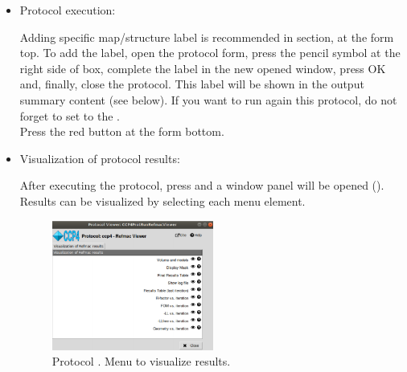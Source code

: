 \begin{itemize}
\item Protocol execution:

  Adding specific map/structure label is recommended in  section, at the form top. To add the label, open the protocol form, press the pencil symbol at the right side of  box, complete the label in the new opened window, press OK and, finally, close the protocol. This label will be shown in the output summary content (see below). If you want to run again this protocol, do not forget to set to  the .\\
  Press the  red button at the form bottom.\\
  
  \item Visualization of protocol results:
  
  After executing the protocol, press  and a window panel will be opened (). Results can be visualized by selecting each menu element. 
  
  \begin{figure}[H]
     \centering 
     \captionsetup{width=.9\linewidth} 
     \includegraphics[width=0.50\textwidth]{Images_appendix/Fig127.pdf}
     \caption{Protocol . Menu to visualize  results.}
     \label{fig:app_protocol_refmac_2}
    \end{figure}
    

\end{itemize}
